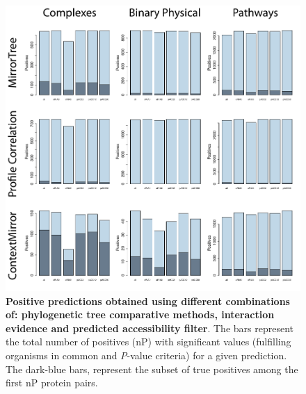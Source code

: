 \begin{figure}[htbp]
\centering
\includegraphics[keepaspectratio,width=\textwidth,height=0.75\textheight]{../figures/accsPositives.pdf}
\caption{\textbf{Positive predictions obtained using different combinations of: phylogenetic tree comparative methods, interaction evidence and predicted accessibility filter}. The bars represent the total number of positives (nP) with significant values (fulfilling organisms in common and \emph{P}-value criteria) for a given prediction. The dark-blue bars, represent the subset of true positives among the first nP protein pairs.}
\label{accspositives.pdf}
\end{figure}


